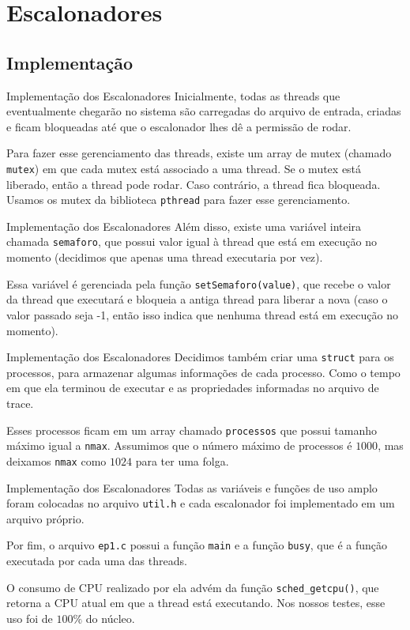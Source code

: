 \documentclass[10pt]{beamer}
\begin{document}
    \section{Escalonadores}
    \subsection{Implementação}
    \begin{frame}{Implementação dos Escalonadores}
    Inicialmente, todas as threads que eventualmente chegarão no sistema são carregadas do arquivo de entrada, criadas e ficam bloqueadas até que o escalonador lhes dê a permissão de rodar.

    Para fazer esse gerenciamento das threads, existe um array de mutex (chamado \texttt{mutex}) em
        que cada mutex está associado a uma thread. Se o mutex está liberado, então a thread pode
        rodar. Caso contrário, a thread fica bloqueada. Usamos os mutex da biblioteca
        \texttt{pthread} para fazer esse gerenciamento.
    \end{frame}
    \begin{frame}{Implementação dos Escalonadores}
        Além disso, existe uma variável inteira chamada \texttt{semaforo},
        que possui valor igual à thread que está em execução no momento
        (decidimos que apenas uma thread executaria por vez).

        Essa variável é gerenciada pela função \texttt{setSemaforo(value)},
        que recebe o valor da thread que executará e bloqueia a antiga
        thread para liberar a nova (caso o valor passado seja -1,
        então isso indica que nenhuma thread está em execução no momento).
    \end{frame}

    \begin{frame}{Implementação dos Escalonadores}
        Decidimos também criar uma \texttt{struct} para os processos, para
        armazenar algumas informações de cada processo. Como o tempo em que ela terminou
        de executar e as propriedades informadas no arquivo de trace.

        Esses processos ficam em um array chamado \texttt{processos} que possui tamanho
        máximo igual a \texttt{nmax}. Assumimos que o número máximo de processos é
        $1000$, mas deixamos \texttt{nmax} como $1024$ para ter uma folga.
    \end{frame}

    \begin{frame}{Implementação dos Escalonadores}
        Todas as variáveis e funções de uso amplo foram colocadas no arquivo
        \texttt{util.h} e cada escalonador foi implementado em um arquivo próprio.

        Por fim, o arquivo \texttt{ep1.c} possui a função \texttt{main} e a função
        \texttt{busy}, que é a função executada por cada uma das threads.

        O consumo de CPU realizado por ela advém da função \texttt{sched\_getcpu()},
        que retorna a CPU atual em que a thread está executando. Nos nossos testes,
        esse uso foi de $100\%$ do núcleo.
    \end{frame}
\end{document}
